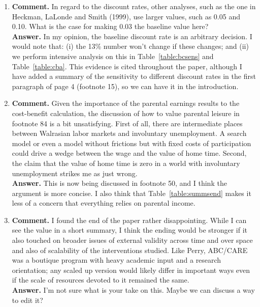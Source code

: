 \begin{enumerate}
\item
\noindent \textbf{Comment.} In regard to the discount rates, other analyses, such as the one in Heckman, LaLonde and Smith (1999), use larger values, such as 0.05 and 0.10. What is the case for making 0.03 the baseline value here? \\

\noindent \textbf{Answer.} In my opinion, the baseline discount rate is an arbitrary decision. I would note that: (i) the 13\% number won't change if these changes; and (ii) we perform intensive analysis on this in Table~\ref{table:bcsens} and Table~\ref{table:cba}. This evidence is cited throughout the paper, although I have added a summary of the sensitivity to different discount rates in the first paragraph of page 4 (footnote 15), so we can have it in the introduction.\\

\item
\noindent \textbf{Comment.} Given the importance of the parental earnings results to the cost-benefit calculation, the discussion of how to value parental leisure in footnote 84 is a bit unsatisfying. First of all, there are intermediate places between Walrasian labor markets and involuntary unemployment. A search model or even a model without frictions but with fixed costs of participation could drive a wedge between the wage and the value of home time. Second, the claim that the value of home time is zero in a world with involuntary unemployment strikes me as just wrong.\\ 

\noindent \textbf{Answer.} This is now being discussed in footnote 50, and I think the argument is more concise. I also think that Table~\ref{table:summsend} makes it less of a concern that everything relies on parental income.\\

\item
\noindent \textbf{Comment.} I found the end of the paper rather disappointing. While I can see the value in a short summary, I think the ending would be stronger if it also touched on broader issues of external validity across time and over space and also of scalability of the interventions studied. Like Perry, ABC/CARE was a boutique program with heavy academic input and a research orientation; any scaled up version would likely differ in important ways even if the scale of resources devoted to it remained the same.\\ 

\noindent \textbf{Answer.} I'm not sure what is your take on this. Maybe we can discuss a way to edit it?\\


\end{enumerate}
